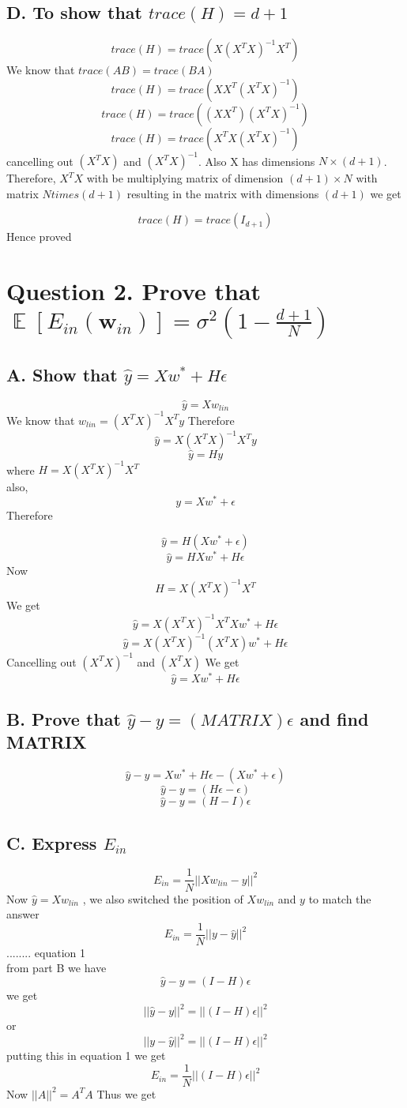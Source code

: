 \documentclass{article}
\DeclareMathOperator{\E}{\mathbb{E}}
\begin{document}
\subsection{D. To show that $trace(H) = d+1$}
$$trace(H) = trace(X(X^TX)^{-1}X^T)$$
We know that $trace(AB) = trace(BA)$
$$trace(H) = trace(XX^T(X^TX)^{-1})$$
$$trace(H) = trace((XX^T)(X^TX)^{-1})$$
$$trace(H) = trace(X^TX(X^TX)^{-1})$$
cancelling out $(X^TX)$ and $(X^TX)^{-1}$. Also X has dimensions $N\times(d+1)$. Therefore, $X^TX$ with be multiplying matrix of dimension $(d+1) \times N$ with matrix $N times (d+1)$ resulting in the matrix with dimensions $(d+1)$
we get 

$$trace(H) = trace(I_{d+1})$$
Hence proved
\section{Question 2. Prove that $\E[E_{in}(\textbf{w}_{in})] = \sigma^2(1-\frac{d+1}{N})$}
\subsection{ A. Show that $\hat{y} = Xw^* +H\epsilon$}
$$\hat{y}=Xw_{lin}$$ 
We know that $w_{lin}=(X^{T}X)^{-1}X^Ty$
Therefore
$$\hat{y}=X(X^{T}X)^{-1}X^Ty$$
$$\hat{y}=Hy$$
where $H=X(X^{T}X)^{-1}X^T$\\
also,
$$y = Xw^*+\epsilon$$
Therefore

$$\hat{y}=H(Xw^*+\epsilon)$$
$$\hat{y}=HXw^*+H\epsilon$$
Now
$$H = X(X^TX)^{-1}X^T$$
We get
$$\hat{y}=X(X^TX)^{-1}X^TXw^*+H\epsilon$$
$$\hat{y}=X(X^TX)^{-1}(X^TX)w^*+H\epsilon$$
Cancelling out $(X^TX)^{-1}$ and $(X^TX)$
We get 
$$\hat{y}=Xw^*+H\epsilon$$

\subsection{B. Prove that  $\hat{y} - y = (MATRIX)\epsilon$ and find MATRIX}
$$\hat{y} - y = Xw^*+H\epsilon -(Xw^*+\epsilon)$$
$$\hat{y} - y = (H\epsilon - \epsilon)$$
$$\hat{y} - y = (H-I)\epsilon$$

\subsection{C. Express $E_{in}$}
$$E_{in} = \frac{1}{N}||Xw_{lin}-y||^2$$
Now $\hat{y} = Xw_{lin}$ , we also switched the position of $Xw_{lin}$ and $y$ to match the answer
$$E_{in} = \frac{1}{N}||y-\hat{y}||^2$$ ........ equation 1\\
from part B we have $$\hat{y} - y = (I-H)\epsilon$$
we get 
$$||\hat{y} - y||^2 = ||(I-H)\epsilon||^2$$
or
$$||y-\hat{y}||^2 = ||(I-H)\epsilon||^2$$
putting this in equation 1 we get 
$$E_{in} = \frac{1}{N}||(I-H)\epsilon||^2$$
Now $||A||^2 = A^TA$
Thus we get 
\end{document}
